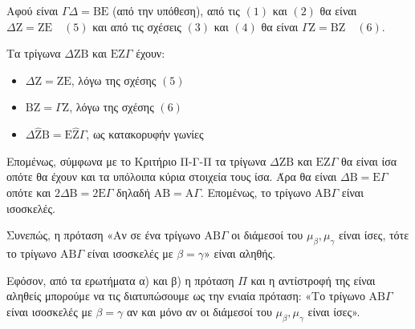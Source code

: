 \begin{alist}
    Αφού είναι $\Gamma\Delta = \mathrm{B}\mathrm{E}$ (από την υπόθεση), από τις $(1)$ και $(2)$ θα είναι $\Delta\mathrm{Z} = \mathrm{Z}\mathrm{E} \quad (5)$ και από τις σχέσεις $(3)$ και $(4)$ θα είναι $\Gamma\mathrm{Z} = \mathrm{B}\mathrm{Z} \quad (6)$.
    
    Τα τρίγωνα $\Delta\mathrm{Z}\mathrm{B}$ και $\mathrm{E}\mathrm{Z}\Gamma$ έχουν:
    \begin{itemize}
        \item $\Delta\mathrm{Z} = \mathrm{Z}\mathrm{E}$, λόγω της σχέσης $(5)$
        \item $\mathrm{B}\mathrm{Z} = \Gamma\mathrm{Z}$, λόγω της σχέσης $(6)$
        \item $\Delta\hat{\mathrm{Z}}\mathrm{B} = \mathrm{E}\hat{\mathrm{Z}}\Gamma$, ως κατακορυφήν γωνίες
    \end{itemize}
    Επομένως, σύμφωνα με το Κριτήριο Π-Γ-Π τα τρίγωνα $\Delta\mathrm{Z}\mathrm{B}$ και $\mathrm{E}\mathrm{Z}\Gamma$ θα είναι ίσα οπότε θα έχουν και τα υπόλοιπα κύρια στοιχεία τους ίσα. Άρα θα είναι $\Delta\mathrm{B} = \mathrm{E}\Gamma$ οπότε και $2\Delta\mathrm{B} = 2\mathrm{E}\Gamma$ δηλαδή $\mathrm{A}\mathrm{B} = \mathrm{A}\Gamma$.
    Επομένως, το τρίγωνο $\mathrm{A}\mathrm{B}\Gamma$ είναι ισοσκελές.
    
    Συνεπώς, η πρόταση «Αν σε ένα τρίγωνο $\mathrm{A}\mathrm{B}\Gamma$ οι διάμεσοί του $\mu_\beta, \mu_\gamma$ είναι ίσες, τότε το τρίγωνο $\mathrm{A}\mathrm{B}\Gamma$ είναι ισοσκελές με $\beta = \gamma$» είναι αληθής.
    
    \item Εφόσον, από τα ερωτήματα α) και β) η πρόταση $\Pi$ και η αντίστροφή της είναι αληθείς μπορούμε να τις διατυπώσουμε ως την ενιαία πρόταση: «Το τρίγωνο $\mathrm{A}\mathrm{B}\Gamma$ είναι ισοσκελές με $\beta = \gamma$ αν και μόνο αν οι διάμεσοί του $\mu_\beta, \mu_\gamma$ είναι ίσες».
\end{alist}

